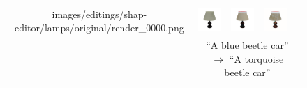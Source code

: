 \begin{figure}
{\begin{tabular}{ccccc}
{images/editings/shap-editor/lamps/original/render_0000.png} &
                      \includegraphics[width=0.15\linewidth, trim=70 45 70 40, clip]
{images/editings/shap-editor/lamps/shap_e/original_shap_e_tile_0.png} &
                    \includegraphics[width=0.15\linewidth, trim=70 45 70 40, clip]
{images/editings/shap-editor/lamps/edit2_shap_e/santa_0.png} &
                      \includegraphics[width=0.15\linewidth, trim=70 45 70 40, clip]
{images/editings/shap-editor/lamps/edit2_sharp_e/0_75_steps_batch_0_a_santa_table_lamp_tile_0.png} \\
        & \multicolumn{4}{c}{``A blue beetle car'' $\longrightarrow$ ``A torquoise beetle car''} \\


\end{tabular}}
\end{figure}
